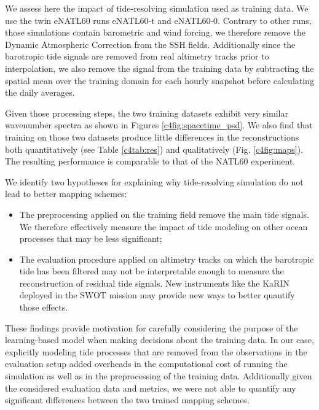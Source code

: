 \begin{bibunit}
We assess here the impact of tide-resolving simulation used as training data. We use the twin eNATL60 runs eNATL60-t and eNATL60-0. Contrary to other runs, those simulations contain barometric and wind forcing, we therefore remove the Dynamic Atmospheric Correction \cite{carrereMajorImprovementAltimetry2016} from the SSH fields. Additionally since the barotropic tide signals are removed from real altimetry tracks prior to interpolation, we also remove the signal from the training data by subtracting the spatial mean over the training domain for each hourly snapshot before calculating the daily averages.  

Given those processing steps, the two training datasets  exhibit very similar wavenumber spectra as shown in Figures \ref{c4fig:spacetime_psd}. 
We also find that training on those two datasets produce little differences in the reconstructions both quantitatively  (see Table \ref{c4tab:res}) and qualitatively (Fig. \ref{c4fig:maps}). The resulting performance is comparable to that of the NATL60 experiment.
 
We identify two hypotheses for explaining why tide-resolving simulation do not lead to better mapping schemes:
\begin{itemize}
    \item The preprocessing applied on the training field remove the main tide signals. We therefore effectively measure the impact of tide modeling on other ocean processes that may be less significant;
    \item The evaluation procedure applied on altimetry tracks on which the barotropic tide has been filtered may not be interpretable enough to measure the reconstruction of residual tide signals. New instruments like the KaRIN deployed in the SWOT mission may provide new ways to better quantify those effects.   
\end{itemize}

These findings provide motivation for carefully considering the purpose of the learning-based model when making decisions about the training data. In our case, explicitly modeling tide processes that are removed from the observations in the evaluation setup added overheads in the computational cost of running the simulation as well as in the preprocessing of the training data. Additionally given the considered evaluation data and metrics, we were not able to quantify any significant differences between the two trained mapping schemes.



\end{bibunit}
